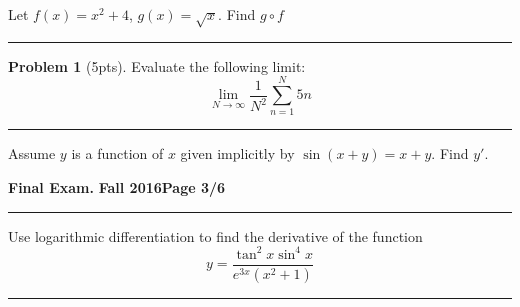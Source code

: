 \documentclass[12pt]{article}
\theoremstyle{definition}
\newtheorem{problem}{Problem}
\begin{document}
{ Let $f(x) = x^2+4$, $g(x) = \sqrt{x}$.  Find $g \circ f$
\vspace{2cm}
\begin{flushright}
\end{flushright}
\hrule

\begin{problem}[5pts]
Evaluate the following limit:
\begin{equation*}
\lim_{N \to \infty} \frac{1}{N^2}\sum_{n=1}^N 5n
\end{equation*}

\vspace{3cm}
\begin{flushright}
\end{flushright}
\end{problem}
\hrule

{\problem[5 pts] Assume $y$ is a function of $x$ given implicitly by $\sin(x+y)=x+y$.  Find $y'$.}
\vspace{4.9cm}
\begin{flushright}
\end{flushright}
\newpage


\hfill{\large\bf Final Exam.}\hfill{\large\bf
  Fall 2016}\hfill{\large\bf Page 3/6}\hrule

\bigskip


{\problem [10 pts] Use logarithmic differentiation to find the
  derivative of the function 
\begin{equation*}
y=\frac{\tan^2 x \sin^4 x}{e^{3x}(x^2+1)}
\end{equation*}
\vspace{8cm}
\begin{flushright}
\end{flushright}
\hrule

}}
\end{document}
